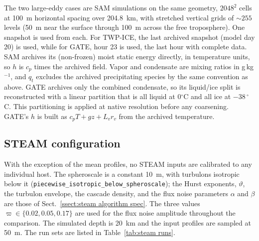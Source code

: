 \documentclass{article}
\begin{document}
The two large-eddy cases are SAM simulations on the same geometry,
$2048^2$ cells at 100~m horizontal spacing over 204.8~km, with
stretched vertical grids of ${\sim}255$ levels (50~m near the surface
through 100~m across the free troposphere). One snapshot is used from
each. For TWP-ICE, the last
archived snapshot (model day 20) is used, while for GATE, hour 23 is used,
the last hour with complete data. SAM archives its
(non-frozen) moist static energy directly, in temperature units, so
$h$ is $c_p$ times the archived field.
Vapor and condensate are mixing ratios in g\,kg$^{-1}$, and $q_t$
excludes the archived precipitating species by the same convention as
above. GATE archives only the combined
condensate, so its liquid/ice split is reconstructed with a
linear partition that is all liquid at 0$^\circ$C and all ice at
$-38\,^\circ$C. This partitioning is applied at native resolution before
any coarsening. GATE's $h$ is built as
$c_p T + g z + L_v r_v$ from the archived temperature.

\subsection{STEAM configuration}
\label{ssect:steam config}

With the exception of the mean profiles, no STEAM inputs are
calibrated to any individual host. The spheroscale is a constant 10~m,
with turbulons isotropic below it
(\texttt{piecewise\_isotropic\allowbreak\_below\allowbreak\_spheroscale}); the Hurst
exponents, $\vartheta$, the turbulon envelope, the cascade density, and
the flux noise parameters $\alpha$ and $\beta$ are those of
Sect.~\ref{ssect:steam algorithm spec}. The three values $\varpi \in \{0.02, 0.05, 0.17\}$ are used for the flux noise amplitude throughout the comparison. The simulated depth is 20~km and
the input profiles are sampled at 50~m. The run sets are listed in
Table~\ref{tab:steam runs}.
\end{document}

